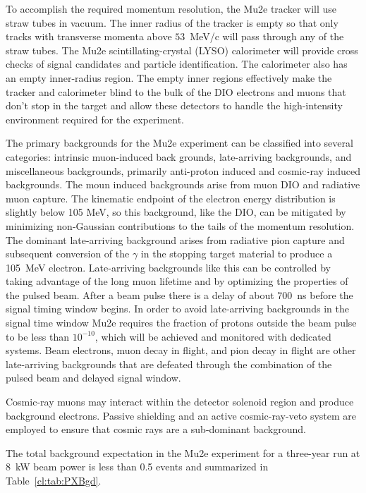  
To accomplish the required momentum resolution, the Mu2e tracker will
use straw tubes in vacuum.  The inner radius of the tracker is empty
so that only tracks with transverse momenta above $53$~MeV/c will pass
through any of the straw tubes. The Mu2e scintillating-crystal (LYSO)
calorimeter will provide cross checks of signal candidates and
particle identification.  The calorimeter also has an empty inner-radius 
region.  The empty inner regions effectively make the tracker
and calorimeter blind to the bulk of the DIO electrons and muons that
don't stop in the target and allow these detectors to handle the
high-intensity environment required for the experiment.


The primary backgrounds for the Mu2e experiment can be classified into
several categories: intrinsic muon-induced back grounds, late-arriving
backgrounds, and miscellaneous backgrounds, primarily anti-proton
induced and cosmic-ray induced backgrounds. The moun induced
backgrounds arise from muon DIO and radiative muon capture.  The
kinematic endpoint of the electron energy distribution is slightly
below 105 MeV, so this background, like the DIO, can be mitigated by
minimizing non-Gaussian contributions to the tails of the momentum
resolution.  The dominant late-arriving background arises from
radiative pion capture and subsequent conversion of the $\gamma$ in
the stopping target material to produce a 105~MeV electron.
Late-arriving backgrounds like this can be controlled by taking
advantage of the long muon lifetime and by optimizing the properties
of the pulsed beam.  After a beam pulse there is a delay of about
700~ns before the signal timing window begins.  In order to avoid
late-arriving backgrounds in the signal time window Mu2e requires the
fraction of protons outside the beam pulse to be less than $10^{-10}$,
which will be achieved and monitored with dedicated systems.  Beam
electrons, muon decay in flight, and pion decay in flight are other
late-arriving backgrounds that are defeated through the combination of
the pulsed beam and delayed signal window.



Cosmic-ray muons may interact within the detector solenoid region and
produce background electrons.  Passive shielding and an active
cosmic-ray-veto system are employed to ensure that cosmic rays are a
sub-dominant background.
 


The total background expectation in the Mu2e experiment for a
three-year run at 8~kW beam power is less than 0.5 events and
summarized in Table~\ref{cl:tab:PXBgd}.

